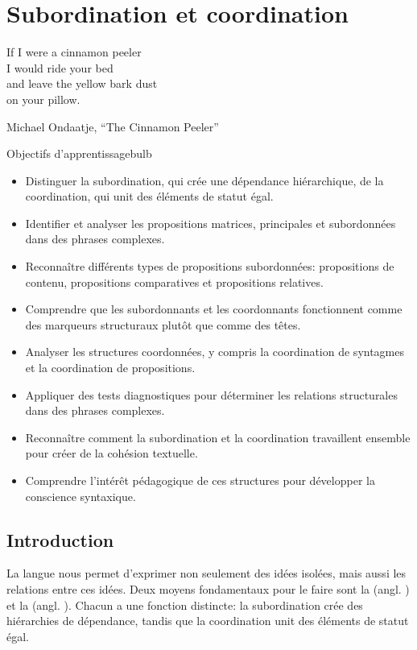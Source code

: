 \chapter{Subordination et coordination} \label{ch:subord-coord-fr}

\epigraph{If I were a cinnamon peeler\\
I would ride your bed\\
and leave the yellow bark dust\\
on your pillow.}{Michael Ondaatje, \enquote{The Cinnamon Peeler}}

\begin{tblsframedsymbol}{Objectifs d'apprentissage}{bulb}
\begin{itemize}[noitemsep, leftmargin=*]
    \item Distinguer la subordination, qui crée une dépendance hiérarchique, de la coordination, qui unit des éléments de statut égal.
    \item Identifier et analyser les propositions matrices, principales et subordonnées dans des phrases complexes.
    \item Reconnaître différents types de propositions subordonnées: propositions de contenu, propositions comparatives et propositions relatives.
    \item Comprendre que les subordonnants et les coordonnants fonctionnent comme des marqueurs structuraux plutôt que comme des têtes.
    \item Analyser les structures coordonnées, y compris la coordination de syntagmes et la coordination de propositions.
    \item Appliquer des tests diagnostiques pour déterminer les relations structurales dans des phrases complexes.
    \item Reconnaître comment la subordination et la coordination travaillent ensemble pour créer de la cohésion textuelle.
    \item Comprendre l'intérêt pédagogique de ces structures pour développer la conscience syntaxique.
\end{itemize}
\end{tblsframedsymbol}

\section{Introduction}

La langue nous permet d'exprimer non seulement des idées isolées, mais aussi les relations entre ces idées. Deux moyens fondamentaux pour le faire sont la  (angl. ) et la  (angl. ). Chacun a une fonction distincte: la subordination crée des hiérarchies de dépendance, tandis que la coordination unit des éléments de statut égal.


